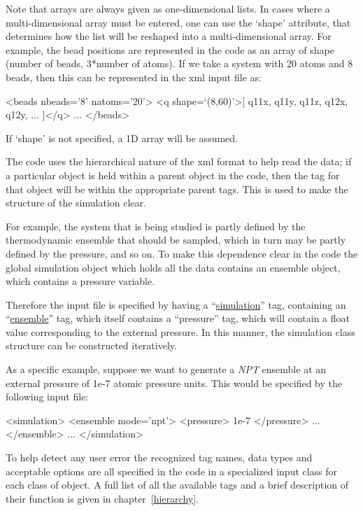 \documentclass[11pt,english,fleqn]{report}
\newenvironment{code}{%
\footnotesize 
\verbatim
}{
\endverbatim
\normalsize
}
\begin{document}
Note that arrays are always given as one-dimensional lists. In cases
where a multi-dimensional array must be entered, one can use the `shape'
attribute, that determines how the list will be reshaped into a multi-dimensional
array. For example, the bead positions are
represented in the code as an array of shape 
(number of beads, 3*number of atoms). If we take a system with 20 atoms
and 8 beads, then this can be represented in the xml input file as:

\begin{code}
<beads nbeads='8' natoms='20'>
   <q shape=`(8,60)'>[ q11x, q11y, q11z, q12x, q12y, ... ]</q>
   ...
</beads>
\end{code}

If `shape' is not specified, a 1D array will be assumed.

The code uses the hierarchical nature of the xml format to help read the data; if
a particular object is held within a parent object in the code, then
the tag for that object will be within the appropriate parent tags.
This is used to make the structure of the simulation clear. 

For example,
the system that is being studied is partly defined by the thermodynamic
ensemble that should be sampled, which in turn may be partly defined
by the pressure, and so on. To make this dependence clear in the code
the global simulation object which holds all the data contains
an ensemble object, which contains a pressure variable.
 
Therefore the input file is specified
by having a {}``\hyperref[SIMULATION]{simulation}'' tag, containing an 
{}``\hyperref[ENSEMBLE]{ensemble}''
tag, which itself contains a {}``pressure'' tag, which will contain
a float value corresponding to the external pressure. In this
manner, the simulation class structure can be constructed iteratively.

As a specific example, suppose we want to generate a \emph{NPT} ensemble at an external
pressure of 1e-7 atomic pressure units. This would be specified by
the following input file: 

\begin{code}
<simulation>
   <ensemble mode='npt'>
      <pressure> 1e-7 </pressure>
      ...
   </ensemble>
   ...
</simulation>
\end{code}

To help detect any user error the recognized tag names, data types
and acceptable options are all specified in the code in a specialized
input class for each class of object. A full list of all the available
tags and a brief description of their function is given in chapter~\ref{hierarchy}.
\end{document}
